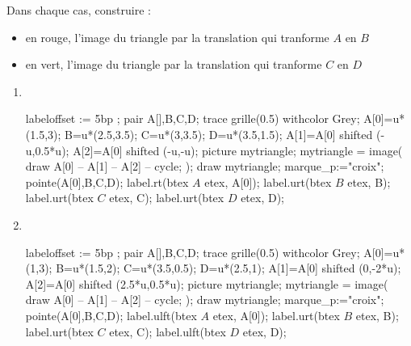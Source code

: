 \begin{exercice*}
    Dans chaque cas, construire :
    \begin{itemize}
        \item en rouge, l'image du triangle par la translation qui tranforme $A$ en $B$
        \item en vert, l'image du triangle par la translation qui tranforme $C$ en $D$
    \end{itemize}
    \begin{changemargin}{-15mm}{0mm}
        \begin{multicols}{2}
            \begin{enumerate}
                \item \phantom{rrr}\\
                \begin{Geometrie}[CoinHD={(4u,4u)}]
                    labeloffset := 5bp ;
                    pair A[],B,C,D;                    
                    trace grille(0.5) withcolor Grey;
                    A[0]=u*(1.5,3);
                    B=u*(2.5,3.5);
                    C=u*(3,3.5);
                    D=u*(3.5,1.5);
                    A[1]=A[0] shifted (-u,0.5*u);
                    A[2]=A[0] shifted (-u,-u);
                    picture mytriangle;
                    mytriangle = image( 
                        draw A[0] -- A[1] -- A[2] -- cycle;
                    );
                    draw mytriangle;
                    marque_p:="croix";
                    pointe(A[0],B,C,D);
                    label.rt(btex $A$ etex, A[0]);
                    label.urt(btex $B$ etex, B);
                    label.urt(btex $C$ etex, C);
                    label.urt(btex $D$ etex, D);
                \end{Geometrie}
                \columnbreak
                \item \phantom{rrr}\\
                \begin{Geometrie}[CoinHD={(4u,4u)}]
                    labeloffset := 5bp ;
                    pair A[],B,C,D;
                    trace grille(0.5) withcolor Grey;
                    A[0]=u*(1,3);
                    B=u*(1.5,2);
                    C=u*(3.5,0.5);
                    D=u*(2.5,1);
                    A[1]=A[0] shifted (0,-2*u);
                    A[2]=A[0] shifted (2.5*u,0.5*u);
                    picture mytriangle;
                    mytriangle = image( 
                        draw A[0] -- A[1] -- A[2] -- cycle;
                    );
                    draw mytriangle;
                    marque_p:="croix";
                    pointe(A[0],B,C,D);
                    label.ulft(btex $A$ etex, A[0]);
                    label.urt(btex $B$ etex, B);
                    label.urt(btex $C$ etex, C);
                    label.ulft(btex $D$ etex, D);                                      
                \end{Geometrie}
            \end{enumerate}
        \end{multicols}    
    \end{changemargin}
\end{exercice*}
